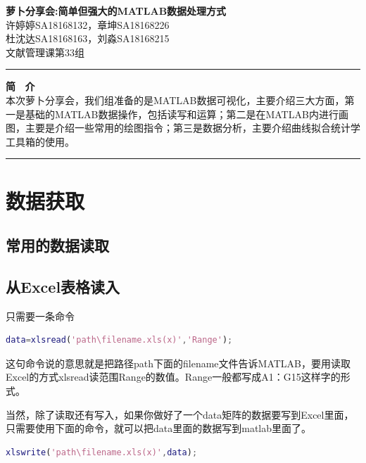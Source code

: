 \documentclass{hfutpaper}
\begin{document}
\begin{center}
\LARGE
  \textbf{萝卜分享会:简单但强大的MATLAB数据处理方式}\\
  \vspace{0.2em}
  \large
    许婷婷SA18168132，章坤SA18168226\\
    杜沈达SA18168163，刘淼SA18168215 \\ %
    文献管理课第33组
  \end{center}
\rule[0.1\baselineskip]{\textwidth}{0.5pt}
\textbf{简 \ 介}\\
\large
本次萝卜分享会，我们组准备的是MATLAB数据可视化，主要介绍三大方面，第一是基础的MATLAB数据操作，包括读写和运算；第二是在MATLAB内进行画图，主要是介绍一些常用的绘图指令；第三是数据分析，主要介绍曲线拟合统计学工具箱的使用。
\\
\rule[0.1\baselineskip]{\textwidth}{0.5pt}
\section{数据获取}
\subsection{常用的数据读取}
\subsection*{从Excel表格读入}
只需要一条命令
\begin{lstlisting}[language=matlab]
data=xlsread('path\filename.xls(x)','Range');
\end{lstlisting}
这句命令说的意思就是把路径path下面的filename文件告诉MATLAB，要用读取Excel的方式xlsread读范围Range的数值。Range一般都写成A1：G15这样字的形式。

当然，除了读取还有写入，如果你做好了一个data矩阵的数据要写到Excel里面，只需要使用下面的命令，就可以把data里面的数据写到matlab里面了。
\begin{lstlisting}[language=matlab]
	xlswrite('path\filename.xls(x)',data);
\end{lstlisting}
\end{document}

